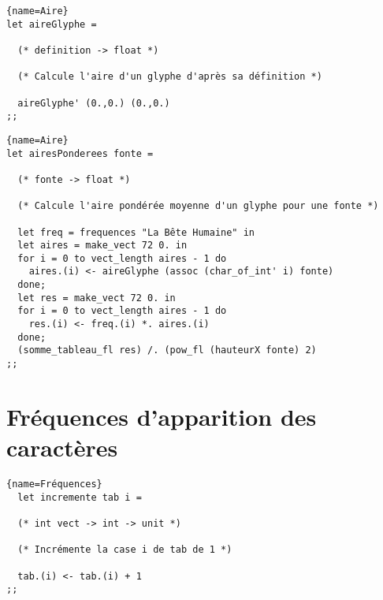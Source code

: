 \documentclass[10pt,twoside,a4paper]{article}
\begin{document}
\begin{lstlisting}{name=Aire}
let aireGlyphe =

  (* definition -> float *)

  (* Calcule l'aire d'un glyphe d'après sa définition *)
  
  aireGlyphe' (0.,0.) (0.,0.)
;;
\end{lstlisting}
\lstset{frame=none}\pagebreak
\begin{lstlisting}{name=Aire}
let airesPonderees fonte =

  (* fonte -> float *)

  (* Calcule l'aire pondérée moyenne d'un glyphe pour une fonte *)
  
  let freq = frequences "La Bête Humaine" in
  let aires = make_vect 72 0. in
  for i = 0 to vect_length aires - 1 do
    aires.(i) <- aireGlyphe (assoc (char_of_int' i) fonte)
  done;
  let res = make_vect 72 0. in
  for i = 0 to vect_length aires - 1 do
    res.(i) <- freq.(i) *. aires.(i)
  done;
  (somme_tableau_fl res) /. (pow_fl (hauteurX fonte) 2)
;;
\end{lstlisting}

\section{Fréquences d'apparition des caractères}%

\begin{lstlisting}{name=Fréquences}
  let incremente tab i =

  (* int vect -> int -> unit *)

  (* Incrémente la case i de tab de 1 *)
  
  tab.(i) <- tab.(i) + 1
;;
\end{lstlisting}
\end{document}
